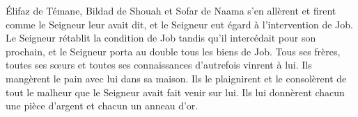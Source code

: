 Élifaz de Témane, Bildad de Shouah et Sofar de Naama s’en allèrent
	et firent comme le Seigneur leur avait dit,
	et le Seigneur eut égard à l’intervention de Job.
Le Seigneur rétablit la condition de Job tandis qu’il intercédait pour son prochain,
	et le Seigneur porta au double tous les biens de Job.
Tous ses frères, toutes ses sœurs et toutes ses connaissances d’autrefois vinrent à lui.
	Ils mangèrent le pain avec lui dans sa maison.
Ils le plaignirent et le consolèrent
	de tout le malheur que le Seigneur avait fait venir sur lui.
Ils lui donnèrent chacun une pièce d’argent et chacun un anneau d’or.
